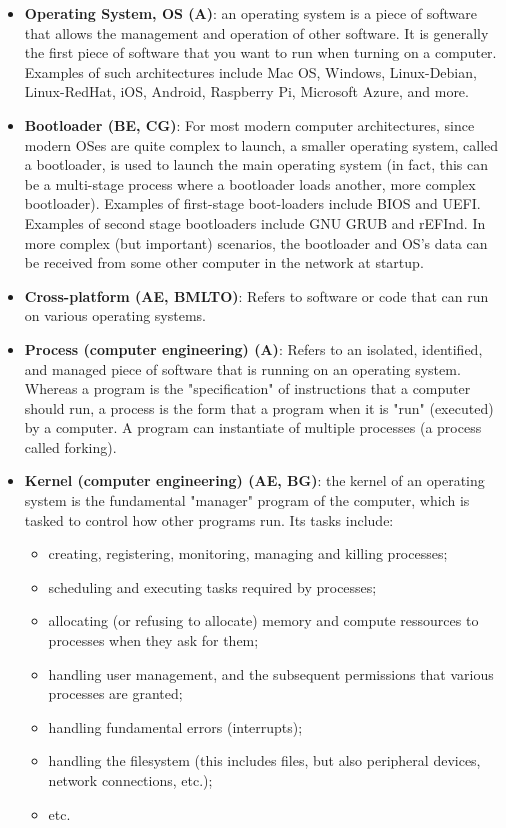 \documentclass{article}
\begin{document}
\begin{itemize}

	\item \textbf{Operating System, OS (A)}: an operating system is a piece of software that allows the management and operation of other software. It is generally the first piece of software that you want to run when turning on a computer. Examples of such architectures include Mac OS, Windows, Linux-Debian, Linux-RedHat, iOS, Android, Raspberry Pi, Microsoft Azure, and more.

	\item \textbf{Bootloader (BE, CG)}: For most modern computer architectures, since modern OSes are quite complex to launch, a smaller operating system, called a bootloader, is used to launch the main operating system (in fact, this can be a multi-stage process where a bootloader loads another, more complex bootloader). Examples of first-stage boot-loaders include BIOS and UEFI. Examples of second stage bootloaders include GNU GRUB and rEFInd. In more complex (but important) scenarios, the bootloader and OS's data can be received from some other computer in the network at startup.

	\item \textbf{Cross-platform (AE, BMLTO)}: Refers to software or code that can run on various operating systems.

	\item \textbf{Process (computer engineering) (A)}: Refers to an isolated, identified, and managed piece of software that is running on an operating system. Whereas a program is the "specification" of instructions that a computer should run, a process is the form that a program when it is "run" (executed) by a computer. A program can instantiate of multiple processes (a process called forking).

	\item \textbf{Kernel (computer engineering) (AE, BG)}: the kernel of an operating system is the fundamental "manager" program of the computer, which is tasked to control how other programs run. Its tasks include:
	\begin{itemize}
		\item creating, registering, monitoring, managing and killing processes;
		\item scheduling and executing tasks required by processes;
		\item allocating (or refusing to allocate) memory and compute ressources to processes when they ask for them;
		\item handling user management, and the subsequent permissions that various processes are granted;
		\item handling fundamental errors (interrupts);
		\item handling the filesystem (this includes files, but also peripheral devices, network connections, etc.);
		\item etc.
	\end{itemize}


\end{itemize}
\end{document}
